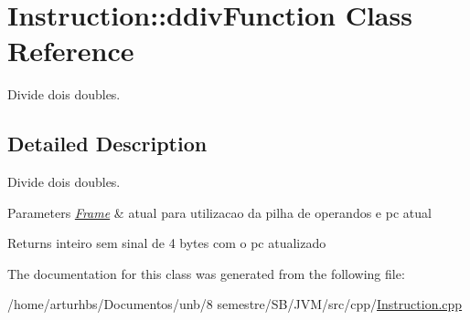 \hypertarget{classInstruction_1_1ddivFunction}{}\section{Instruction\+:\+:ddiv\+Function Class Reference}
\label{classInstruction_1_1ddivFunction}


Divide dois doubles.  




\subsection{Detailed Description}
Divide dois doubles. 


\begin{DoxyParams}{Parameters}
{\em \hyperlink{classFrame}{Frame}} & atual para utilizacao da pilha de operandos e pc atual \\
\hline
\end{DoxyParams}
\begin{DoxyReturn}{Returns}
inteiro sem sinal de 4 bytes com o pc atualizado 
\end{DoxyReturn}


The documentation for this class was generated from the following file\+:\begin{DoxyCompactItemize}
\item 
/home/arturhbs/\+Documentos/unb/8 semestre/\+S\+B/\+J\+V\+M/src/cpp/\hyperlink{Instruction_8cpp}{Instruction.\+cpp}\end{DoxyCompactItemize}
